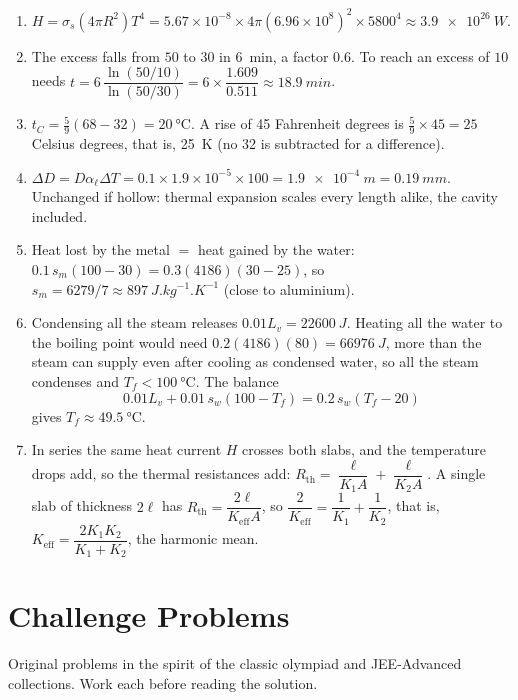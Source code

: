 {\begin{enumerate}[itemsep=2pt]
\item $H=\sigma_{\!s}(4\pi R^2)T^4=5.67\times10^{-8}\times4\pi(6.96\times10^{8})^2\times5800^4
      \approx\SI{3.9e26}{W}$.
\item The excess falls from $50$ to $30$ in \SI{6}{min}, a factor $0.6$. To reach an excess of $10$
      needs $t=6\,\dfrac{\ln(50/10)}{\ln(50/30)}=6\times\dfrac{1.609}{0.511}\approx\SI{18.9}{min}$.
\item $t_C = \tfrac59(68-32) = \SI{20}{\celsius}$. A rise of 45 Fahrenheit degrees is
      $\tfrac59\times45 = 25$ Celsius degrees, that is, \SI{25}{K} (no 32 is subtracted for a difference).
\item $\Delta D = D\alpha_\ell\Delta T = 0.1\times1.9\times10^{-5}\times100 = \SI{1.9e-4}{m}=\SI{0.19}{mm}$.
      Unchanged if hollow: thermal expansion scales every length alike, the cavity included.
\item Heat lost by the metal $=$ heat gained by the water:
      $0.1\,s_m(100-30) = 0.3(4186)(30-25)$, so
      $s_m = 6279/7 \approx \SI{897}{J.kg^{-1}.K^{-1}}$ (close to aluminium).
\item Condensing all the steam releases $0.01L_v = \SI{22600}{J}$. Heating all the water to the
      boiling point would need $0.2(4186)(80)=\SI{66976}{J}$, more than the steam can supply even
      after cooling as condensed water, so all the steam condenses and $T_f < \SI{100}{\celsius}$. The
      balance
      \[0.01L_v + 0.01\,s_w(100-T_f) = 0.2\,s_w(T_f-20)\]
      gives $T_f \approx \SI{49.5}{\celsius}$.
\item In series the same heat current $H$ crosses both slabs, and the temperature drops add, so the
      thermal resistances add: $R_{\text{th}}=\dfrac{\ell}{K_1A}+\dfrac{\ell}{K_2A}$. A single slab of
      thickness $2\ell$ has $R_{\text{th}}=\dfrac{2\ell}{K_{\text{eff}}A}$, so
      $\dfrac{2}{K_{\text{eff}}} = \dfrac{1}{K_1}+\dfrac{1}{K_2}$, that is,
      $K_{\text{eff}} = \dfrac{2K_1K_2}{K_1+K_2}$, the harmonic mean.
\end{enumerate}
}

\section{Challenge Problems}\label{sec:challenge-thermal}

Original problems in the spirit of the classic olympiad and JEE-Advanced collections. Work each before
reading the solution.

